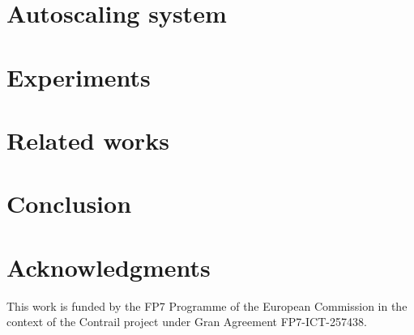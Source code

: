 \documentclass{sig-alternate-10pt}
\begin{document}
%


%


\section{Autoscaling system}




\section{Experiments \label{sec:experiments}}



\section{Related works \label{sec:relatedWorks}}



\section{Conclusion \label{sec:conclusion}}



\section{Acknowledgments}
This work is funded by the FP7 Programme of the European Commission in the context of the Contrail project under Gran Agreement FP7-ICT-257438.

\balancecolumns

%
%
\end{document}
